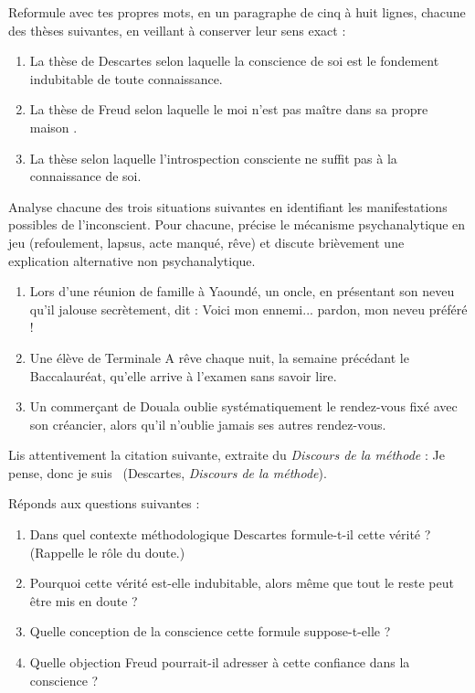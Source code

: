 \documentclass[11pt]{article}
\newcounter{popsec}
\newcounter{popsub}
\newcommand{\courssub}[1]{%
  \stepcounter{popsub}%
  \par\vspace{9pt}\noindent{\popxbold\fontsize{11.5}{13}\selectfont\color{popink}{\color{poporange}\thepopsec.\thepopsub}\hspace{6pt}#1}\par\nopagebreak\vspace{4pt}
}
\begin{document}
\courssub{Je m'entraîne}

\begin{exercice}
Reformule avec tes propres mots, en un paragraphe de cinq à huit lignes, chacune des thèses suivantes, en veillant à conserver leur sens exact :
\begin{enumerate}
\item La thèse de Descartes selon laquelle la conscience de soi est le fondement indubitable de toute connaissance.
\item La thèse de Freud selon laquelle \guillemotleft le moi n'est pas maître dans sa propre maison \guillemotright.
\item La thèse selon laquelle l'introspection consciente ne suffit pas à la connaissance de soi.
\end{enumerate}
\end{exercice}

\begin{exercice}
Analyse chacune des trois situations suivantes en identifiant les manifestations possibles de l'inconscient. Pour chacune, précise le mécanisme psychanalytique en jeu (refoulement, lapsus, acte manqué, rêve) et discute brièvement une explication alternative non psychanalytique.
\begin{enumerate}
\item Lors d'une réunion de famille à Yaoundé, un oncle, en présentant son neveu qu'il jalouse secrètement, dit : \guillemotleft Voici mon ennemi... pardon, mon neveu préféré ! \guillemotright
\item Une élève de Terminale A rêve chaque nuit, la semaine précédant le Baccalauréat, qu'elle arrive à l'examen sans savoir lire.
\item Un commerçant de Douala oublie systématiquement le rendez-vous fixé avec son créancier, alors qu'il n'oublie jamais ses autres rendez-vous.
\end{enumerate}
\end{exercice}

\begin{exercice}
Lis attentivement la citation suivante, extraite du \emph{Discours de la méthode} : \guillemotleft Je pense, donc je suis \guillemotright\ (Descartes, \emph{Discours de la méthode}).

Réponds aux questions suivantes :
\begin{enumerate}
\item Dans quel contexte méthodologique Descartes formule-t-il cette vérité ? (Rappelle le rôle du doute.)
\item Pourquoi cette vérité est-elle indubitable, alors même que tout le reste peut être mis en doute ?
\item Quelle conception de la conscience cette formule suppose-t-elle ?
\item Quelle objection Freud pourrait-il adresser à cette confiance dans la conscience ?
\end{enumerate}
\end{exercice}
\end{document}
